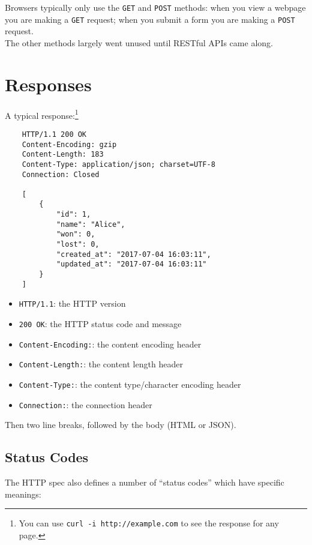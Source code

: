 Browsers typically only use the \texttt{GET} and \texttt{POST} methods: when you view a webpage you are making a \texttt{GET} request; when you submit a form you are making a \texttt{POST} request.
\\

The other methods largely went unused until RESTful APIs came along.

\section{Responses}

A typical response:\footnote{You can use \texttt{curl -i http://example.com} to see the response for any page.}

\begin{verbatim}
    HTTP/1.1 200 OK
    Content-Encoding: gzip
    Content-Length: 183
    Content-Type: application/json; charset=UTF-8
    Connection: Closed

    [
        {
            "id": 1,
            "name": "Alice",
            "won": 0,
            "lost": 0,
            "created_at": "2017-07-04 16:03:11",
            "updated_at": "2017-07-04 16:03:11"
        }
    ]
\end{verbatim}

\begin{itemize}[leftmargin=*]
    \item \texttt{HTTP/1.1}: the HTTP version
    \item \texttt{200 OK}: the HTTP status code and message
    \item \texttt{Content-Encoding:}: the content encoding header
    \item \texttt{Content-Length:}: the content length header
    \item \texttt{Content-Type:}: the content type/character encoding header
    \item \texttt{Connection:}: the connection header
\end{itemize}

Then two line breaks, followed by the body (HTML or JSON).


\pagebreak


\subsection{Status Codes}

The HTTP spec also defines a number of ``status codes'' which have specific meanings:

